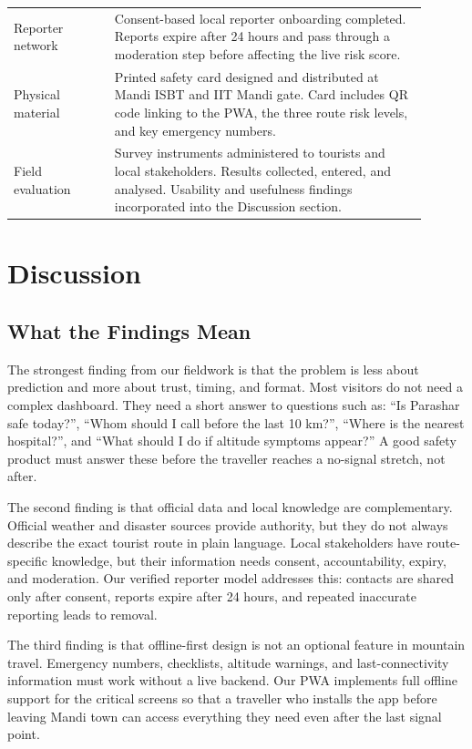 \documentclass[12pt,a4paper]{article}
\begin{document}
\begin{longtable}{p{0.22\linewidth}p{0.68\linewidth}}
  Reporter network & Consent-based local reporter onboarding completed. Reports expire after 24 hours and pass through a moderation step before affecting the live risk score.\\[0.3em]
  Physical material & Printed safety card designed and distributed at Mandi ISBT and IIT Mandi gate. Card includes QR code linking to the PWA, the three route risk levels, and key emergency numbers.\\[0.3em]
  Field evaluation & Survey instruments administered to tourists and local stakeholders. Results collected, entered, and analysed. Usability and usefulness findings incorporated into the Discussion section.\\
  \bottomrule
\end{longtable}

\section{Discussion}

\subsection{What the Findings Mean}

The strongest finding from our fieldwork is that the problem is less about prediction and more about trust, timing, and format. Most visitors do not need a complex dashboard. They need a short answer to questions such as: ``Is Parashar safe today?'', ``Whom should I call before the last 10 km?'', ``Where is the nearest hospital?'', and ``What should I do if altitude symptoms appear?'' A good safety product must answer these before the traveller reaches a no-signal stretch, not after.

The second finding is that official data and local knowledge are complementary. Official weather and disaster sources provide authority, but they do not always describe the exact tourist route in plain language. Local stakeholders have route-specific knowledge, but their information needs consent, accountability, expiry, and moderation. Our verified reporter model addresses this: contacts are shared only after consent, reports expire after 24 hours, and repeated inaccurate reporting leads to removal.

The third finding is that offline-first design is not an optional feature in mountain travel. Emergency numbers, checklists, altitude warnings, and last-connectivity information must work without a live backend. Our PWA implements full offline support for the critical screens so that a traveller who installs the app before leaving Mandi town can access everything they need even after the last signal point.
\end{document}
